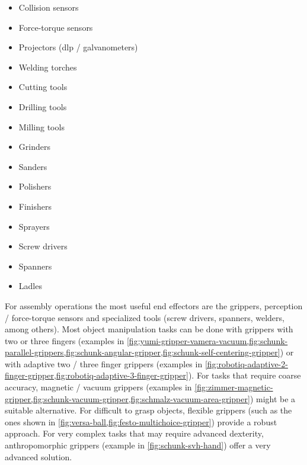 \begin{itemize}
\begin{itemize}
		\item 2D / \gls{tof} cameras
		\item Point / line lasers
		\item \glspl{lidar}
		\item RGB-D sensors
		\item Structured light sensors
	\end{itemize}
	\item Collision sensors
	\item Force-torque sensors
	\item Projectors (\gls{dlp} / galvanometers)
	\item Welding torches
	\item Cutting tools
	\item Drilling tools
	\item Milling tools
	\item Grinders
	\item Sanders
	\item Polishers
	\item Finishers
	\item Sprayers
	\item Screw drivers
	\item Spanners
	\item Ladles
\end{itemize}


For assembly operations the most useful end effectors are the grippers, perception / force-torque sensors and specialized tools (screw drivers, spanners, welders, among others). Most object manipulation tasks can be done with grippers with two or three fingers (examples in \cref{fig:yumi-gripper-vamera-vacuum,fig:schunk-parallel-grippers,fig:schunk-angular-gripper,fig:schunk-self-centering-gripper}) or with adaptive two / three finger grippers (examples in \cref{fig:robotiq-adaptive-2-finger-gripper,fig:robotiq-adaptive-3-finger-gripper}). For tasks that require coarse accuracy, magnetic / vacuum grippers (examples in \cref{fig:zimmer-magnetic-gripper,fig:schunk-vacuum-gripper,fig:schmalz-vacuum-area-gripper}) might be a suitable alternative. For difficult to grasp objects, flexible grippers (such as the ones shown in \cref{fig:versa-ball,fig:festo-multichoice-gripper}) provide a robust approach. For very complex tasks that may require advanced dexterity, anthropomorphic grippers \cite{Amor2012,Mattar2013} (example in \cref{fig:schunk-svh-hand}) offer a very advanced solution.

